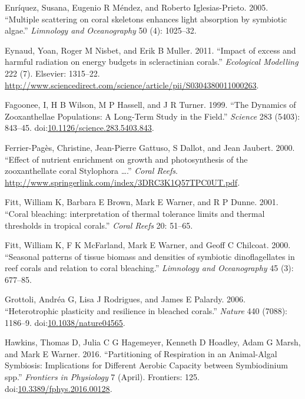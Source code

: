 \documentclass[]{elsarticle} %
\begin{document}
\hypertarget{ref-Enriquez:2005p142}{}
Enríquez, Susana, Eugenio R Méndez, and Roberto Iglesias-Prieto. 2005.
``Multiple scattering on coral skeletons enhances light absorption by
symbiotic algae.'' \emph{Limnology and Oceanography} 50 (4): 1025--32.

\hypertarget{ref-Eynaud:2011tv}{}
Eynaud, Yoan, Roger M Nisbet, and Erik B Muller. 2011. ``Impact of
excess and harmful radiation on energy budgets in scleractinian
corals.'' \emph{Ecological Modelling} 222 (7). Elsevier: 1315--22.
\url{http://www.sciencedirect.com/science/article/pii/S0304380011000263}.

\hypertarget{ref-Fagoonee:1999p4136}{}
Fagoonee, I, H B Wilson, M P Hassell, and J R Turner. 1999. ``The
Dynamics of Zooxanthellae Populations: A Long-Term Study in the Field.''
\emph{Science} 283 (5403): 843--45.
doi:\href{https://doi.org/10.1126/science.283.5403.843}{10.1126/science.283.5403.843}.

\hypertarget{ref-FerrierPages:2000p1950}{}
Ferrier-Pagès, Christine, Jean-Pierre Gattuso, S Dallot, and Jean
Jaubert. 2000. ``Effect of nutrient enrichment on growth and
photosynthesis of the zooxanthellate coral Stylophora \ldots{}.''
\emph{Coral Reefs}.
\url{http://www.springerlink.com/index/3DRC3K1Q57TPC0UT.pdf}.

\hypertarget{ref-Fitt:2001p832}{}
Fitt, William K, Barbara E Brown, Mark E Warner, and R P Dunne. 2001.
``Coral bleaching: interpretation of thermal tolerance limits and
thermal thresholds in tropical corals.'' \emph{Coral Reefs} 20: 51--65.

\hypertarget{ref-Fitt:2000p3792}{}
Fitt, William K, F K McFarland, Mark E Warner, and Geoff C Chilcoat.
2000. ``Seasonal patterns of tissue biomass and densities of symbiotic
dinoflagellates in reef corals and relation to coral bleaching.''
\emph{Limnology and Oceanography} 45 (3): 677--85.

\hypertarget{ref-Grottoli:2006p3692}{}
Grottoli, Andréa G, Lisa J Rodrigues, and James E Palardy. 2006.
``Heterotrophic plasticity and resilience in bleached corals.''
\emph{Nature} 440 (7088): 1186--9.
doi:\href{https://doi.org/10.1038/nature04565}{10.1038/nature04565}.

\hypertarget{ref-Hawkins:2016jj}{}
Hawkins, Thomas D, Julia C G Hagemeyer, Kenneth D Hoadley, Adam G Marsh,
and Mark E Warner. 2016. ``Partitioning of Respiration in an
Animal-Algal Symbiosis: Implications for Different Aerobic Capacity
between Symbiodinium spp.'' \emph{Frontiers in Physiology} 7 (April).
Frontiers: 125.
doi:\href{https://doi.org/10.3389/fphys.2016.00128}{10.3389/fphys.2016.00128}.
\end{document}
